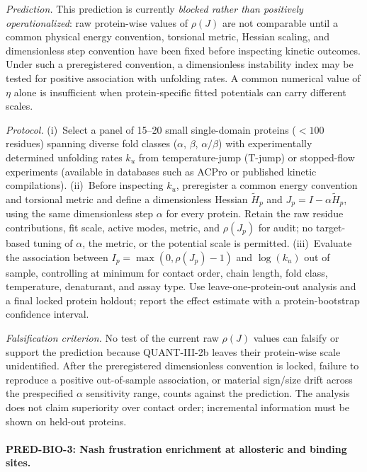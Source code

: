 \documentclass[12pt,a4paper]{article}
\theoremstyle{remark}
\begin{document}
\textit{Prediction.}
This prediction is currently \emph{blocked rather than positively operationalized}: raw protein-wise values of $\rho(J)$ are not comparable until a common physical energy convention, torsional metric, Hessian scaling, and dimensionless step convention have been fixed before inspecting kinetic outcomes. Under such a preregistered convention, a dimensionless instability index may be tested for positive association with unfolding rates. A common numerical value of $\eta$ alone is insufficient when protein-specific fitted potentials can carry different scales.

\textit{Protocol.}
(i)~Select a panel of 15--20 small single-domain proteins ($< 100$ residues) spanning diverse fold classes ($\alpha$, $\beta$, $\alpha/\beta$) with experimentally determined unfolding rates $k_u$ from temperature-jump (T-jump) or stopped-flow experiments (available in databases such as ACPro or published kinetic compilations).
(ii)~Before inspecting $k_u$, preregister a common energy convention and torsional metric and define a dimensionless Hessian $\widetilde H_p$ and $J_p=I-\alpha\widetilde H_p$, using the same dimensionless step $\alpha$ for every protein. Retain the raw residue contributions, fit scale, active modes, metric, and $\rho(J_p)$ for audit; no target-based tuning of $\alpha$, the metric, or the potential scale is permitted.
(iii)~Evaluate the association between $I_p=\max(0,\rho(J_p)-1)$ and $\log(k_u)$ out of sample, controlling at minimum for contact order, chain length, fold class, temperature, denaturant, and assay type. Use leave-one-protein-out analysis and a final locked protein holdout; report the effect estimate with a protein-bootstrap confidence interval.

\textit{Falsification criterion.}
No test of the current raw $\rho(J)$ values can falsify or support the prediction because QUANT-III-2b leaves their protein-wise scale unidentified. After the preregistered dimensionless convention is locked, failure to reproduce a positive out-of-sample association, or material sign/size drift across the prespecified $\alpha$ sensitivity range, counts against the prediction. The analysis does not claim superiority over contact order; incremental information must be shown on held-out proteins.

\paragraph{PRED-BIO-3: Nash frustration enrichment at allosteric and binding sites.}
\end{document}
